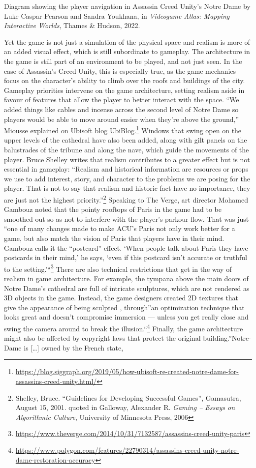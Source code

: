 \documentclass[
  openany]{book}
\begin{document}
Diagram showing the player navigation in Assassin Creed Unity's Notre Dame by Luke Caspar Pearson and Sandra Youkhana, in \emph{Videogame Atlas: Mapping Interactive Worlds}, Thames \& Hudson, 2022.

Yet the game is not just a simulation of the physical space and realism is more of an added visual effect, which is still subordinate to gameplay. The architecture in the game is still part of an environment to be played, and not just seen. In the case of Assassin's Creed Unity, this is especially true, as the game mechanics focus on the character's ability to climb over the roofs and buildings of the city. Gameplay priorities intervene on the game architecture, setting realism aside in favour of features that allow the player to better interact with the space. ``We added things like cables and incense across the second level of Notre Dame so players would be able to move around easier when they're above the ground,'' Miousse explained on Ubisoft blog UbiBlog.\footnote{\url{https://blog.siggraph.org/2019/05/how-ubisoft-re-created-notre-dame-for-assassins-creed-unity.html/}} Windows that swing open on the upper levels of the cathedral have also been added, along with gilt panels on the balustrades of the tribune and along the nave, which guide the movements of the player. Bruce Shelley writes that realism contributes to a greater effect but is not essential in gameplay: ``Realism and historical information are resources or props we use to add interest, story, and character to the problems we are posing for the player. That is not to say that realism and historic fact have no importance, they are just not the highest priority.''\footnote{Shelley, Bruce. ``Guidelines for Developing Successful Games'', Gamasutra, August 15, 2001. quoted in Galloway, Alexander R. \emph{Gaming -- Essays on Algorithmic Culture}, University of Minnesota Press, 2006} Speaking to The Verge, art director Mohamed Gambouz noted that the pointy rooftops of Paris in the game had to be smoothed out so as not to interfere with the player's parkour flow. That was just ``one of many changes made to make ACU's Paris not only work better for a game, but also match the vision of Paris that players have in their mind. Gambouz calls it the ``postcard'' effect. `When people talk about Paris they have postcards in their mind,' he says, `even if this postcard isn't accurate or truthful to the setting.'``\footnote{\url{https://www.theverge.com/2014/10/31/7132587/assassins-creed-unity-paris}} There are also technical restrictions that get in the way of realism in game architecture. For example, the tympana above the main doors of Notre Dame's cathedral are full of intricate sculptures, which are not rendered as 3D objects in the game. Instead, the game designers created 2D textures that give the appearance of being sculpted , through''an optimization technique that looks great and doesn't compromise immersion --- unless you get really close and swing the camera around to break the illusion.``\footnote{\url{https://www.polygon.com/features/22790314/assassins-creed-unity-notre-dame-restoration-accuracy}} Finally, the game architecture might also be affected by copyright laws that protect the original building.''Notre-Dame is {[}\ldots{]} owned by the French state, 
\end{document}

